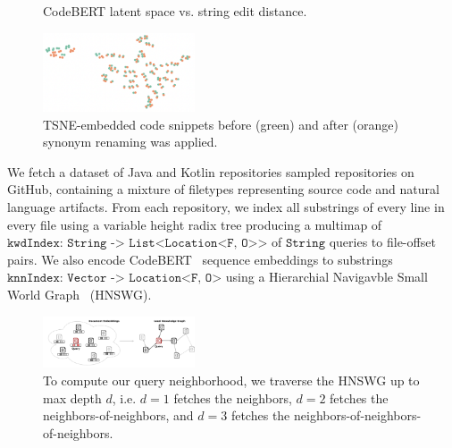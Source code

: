 \documentclass[sigconf,review,anonymous]{acmart}
\begin{document}
\begin{figure}[H]
{
    }
    \caption{CodeBERT latent space vs. string edit distance.}
    \label{fig:lev_vs_euclid}
  \end{figure}

  \begin{figure}[H]
    \centering
    \includegraphics[width=0.4\textwidth]{figs/rename_tokens}
    \caption{TSNE-embedded code snippets before (green) and after (orange) synonym renaming was applied.}
    \label{fig:embedding}
  \end{figure}

  We fetch a dataset of Java and Kotlin repositories sampled repositories on GitHub, containing a mixture of filetypes representing source code and natural language artifacts.
%
  From each repository, we index all substrings of every line in every file using a variable height radix tree producing a multimap of $\texttt{kwdIndex: String -> List<Location<F, O>>}$ of $\texttt{String}$  queries to file-offset pairs. We also encode CodeBERT~\citep{feng2020codebert} sequence embeddings to substrings $\texttt{knnIndex: Vector -> Location<F, O>}$ using a Hierarchial Navigavble Small World Graph~\citep{malkov2018efficient} (HNSWG).


  \begin{figure}[H]
    \centering
    \includegraphics[width=0.4\textwidth]{figs/latent_kg}
    \caption{To compute our query neighborhood, we traverse the HNSWG up to max depth $d$, i.e. $d=1$ fetches the neighbors, $d=2$ fetches the neighbors-of-neighbors, and $d=3$ fetches the neighbors-of-neighbors-of-neighbors.}
    \label{fig:de2kg}
  \end{figure}
\end{document}
